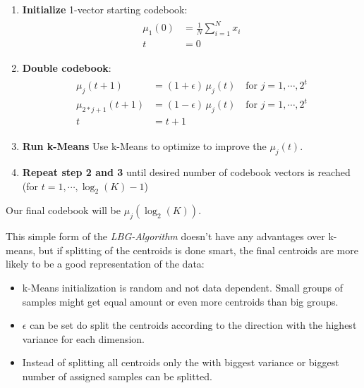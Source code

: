 \begin{enumerate}
\item \textbf{Initialize} 1-vector starting codebook:
	\begin{align}
	\begin{split}
	\mu_1(0) &= \frac{1}{N} \sum\limits_{i=1}^N x_i\\
	t &= 0
	\end{split}
	\end{align}
\item \textbf{Double codebook}:
	\begin{align}
	\begin{split}
	\mu_j(t+1) &= (1+\epsilon)\, \mu_j(t) \quad \text{for } j=1,\cdots,2^t\\
	\mu_{2*j+1}(t+1) &= (1-\epsilon)\, \mu_j(t) \quad \text{for } j=1,\cdots,2^t\\
	t &= t+1
	\end{split}
	\end{align}
\item \textbf{Run k-Means} Use k-Means to optimize to improve the $\mu_j(t)$.
\item \textbf{Repeat step 2 and 3} until desired number of codebook vectors is
      reached (for $t=1,\cdots,\log_2(K)-1$)
\end{enumerate}

Our final codebook will be $\mu_j(\log_2(K))$.

This simple form of the \emph{LBG-Algorithm} doesn't have any advantages over
k-means, but if splitting of the centroids is done smart, the final centroids
are more likely to be a good representation of the data:
\begin{itemize}
    \item k-Means initialization is random and not data dependent. Small groups of
          samples might get equal amount or even more centroids than big groups.
    \item $\epsilon$ can be set do split the centroids according to the
          direction with the highest     variance for each dimension.
    \item Instead of splitting all centroids only the  with biggest variance or
          biggest number of assigned samples can be splitted.
\end{itemize}
